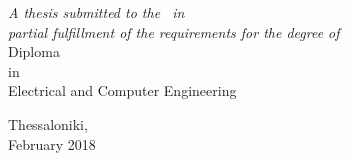 \begin{titlepage}
\begin{center}
\vfill

\large \textit{
    A thesis submitted to the \facname\ in\\
    partial fulfillment of the requirements for the degree of
}\\
[0.5cm]
Diploma\\ in\\ Electrical and Computer Engineering\\
[1.5cm]

\vfill

{\large Thessaloniki,\\February 2018}\\[4cm]

\vfill

\end{center}
\end{titlepage}

